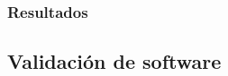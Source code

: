   \subsubsection{Resultados}  

  \newpage





  \subsection{Validación de software}  

  \newpage

